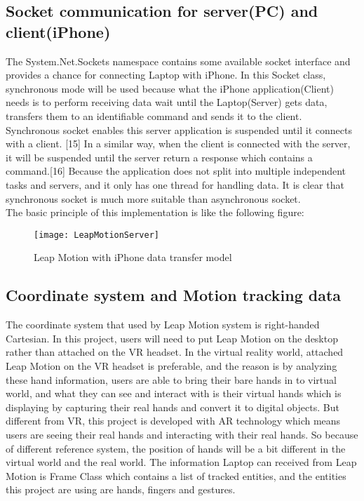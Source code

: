 \subsection{Socket communication for server(PC) and client(iPhone)}
The System.Net.Sockets namespace contains some available socket interface and provides a chance for connecting Laptop with iPhone. In this Socket class, synchronous mode will be used because what the iPhone application(Client) needs is to perform receiving data wait until the Laptop(Server) gets data, transfers them to an identifiable command and sends it to the client. Synchronous socket enables this server application is suspended until it connects with a client. [15] In a similar way, when the client is connected with the server, it will be suspended until the server return a response which contains a command.[16] Because the application does not split into multiple independent tasks and servers, and it only has one thread for handling data. It is clear that synchronous socket is much more suitable than asynchronous socket.
\\
The basic principle of this implementation is like the following figure:
\\
\begin{figure}[h]
    \centering
	\texttt{[image: LeapMotionServer]}
    \caption{Leap Motion with iPhone data transfer model}
    \label{fig:mesh1}
\end{figure}


\subsection{Coordinate system and Motion tracking data}
The coordinate system that used by Leap Motion system is right-handed Cartesian. In this project, users will need to put Leap Motion on the desktop rather than attached on the VR headset. In the virtual reality world, attached Leap Motion on the VR headset is preferable, and the reason is by analyzing these hand information, users are able to bring their bare hands in to virtual world, and what they can see and interact with is their virtual hands which is displaying by capturing their real hands and convert it to digital objects. But different from VR, this project is developed with AR technology which means users are seeing their real hands and interacting with their real hands. So because of different reference system, the position of hands will be a bit different in the virtual world and the real world. The information Laptop can received from Leap Motion is Frame Class which contains a list of tracked entities, and the entities this project are using are hands, fingers and gestures. 

